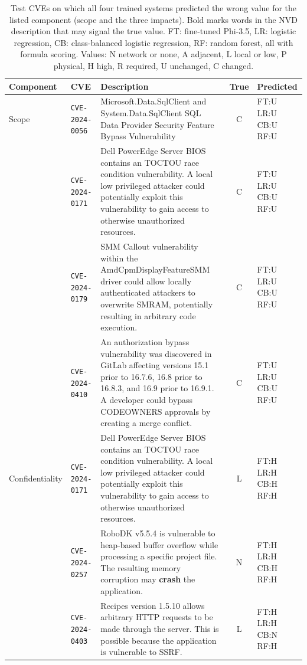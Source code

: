 \begin{table}[p]
\centering
\caption{Test CVEs on which all four trained systems predicted the wrong value for the listed component (scope and the three impacts). Bold marks words in the NVD description that may signal the true value. FT: fine-tuned Phi-3.5, LR: logistic regression, CB: class-balanced logistic regression, RF: random forest, all with formula scoring. Values: N network or none, A adjacent, L local or low, P physical, H high, R required, U unchanged, C changed.}
\label{tab:qualallb}
\scriptsize
\setlength{\tabcolsep}{3pt}
\begin{tabular}{@{}llp{6.2cm}cl@{}}
\toprule
Component & CVE & Description & True & Predicted \\
\midrule
Scope & \texttt{CVE-2024-0056} & Microsoft.Data.SqlClient and System.Data.SqlClient SQL Data Provider Security Feature Bypass Vulnerability & C & FT:U LR:U CB:U RF:U \\
 & \texttt{CVE-2024-0171} & Dell PowerEdge Server BIOS contains an TOCTOU race condition vulnerability. A local low privileged attacker could potentially exploit this vulnerability to gain access to otherwise unauthorized resources. & C & FT:U LR:U CB:U RF:U \\
 & \texttt{CVE-2024-0179} & SMM Callout vulnerability within the AmdCpmDisplayFeatureSMM driver could allow locally authenticated attackers to overwrite SMRAM, potentially resulting in arbitrary code execution. & C & FT:U LR:U CB:U RF:U \\
 & \texttt{CVE-2024-0410} & An authorization bypass vulnerability was discovered in GitLab affecting versions 15.1 prior to 16.7.6, 16.8 prior to 16.8.3, and 16.9 prior to 16.9.1. A developer could bypass CODEOWNERS approvals by creating a merge conflict. & C & FT:U LR:U CB:U RF:U \\
\addlinespace[3pt]
Confidentiality & \texttt{CVE-2024-0171} & Dell PowerEdge Server BIOS contains an TOCTOU race condition vulnerability. A local low privileged attacker could potentially exploit this vulnerability to gain access to otherwise unauthorized resources. & L & FT:H LR:H CB:H RF:H \\
 & \texttt{CVE-2024-0257} & RoboDK v5.5.4 is vulnerable to heap-based buffer overflow while processing a specific project file. The resulting memory corruption may \textbf{crash} the application. & N & FT:H LR:H CB:H RF:H \\
 & \texttt{CVE-2024-0403} & Recipes version 1.5.10 allows arbitrary HTTP requests to be made through the server. This is possible because the application is vulnerable to SSRF. & L & FT:H LR:H CB:N RF:H \\

\end{tabular}
\end{table}
